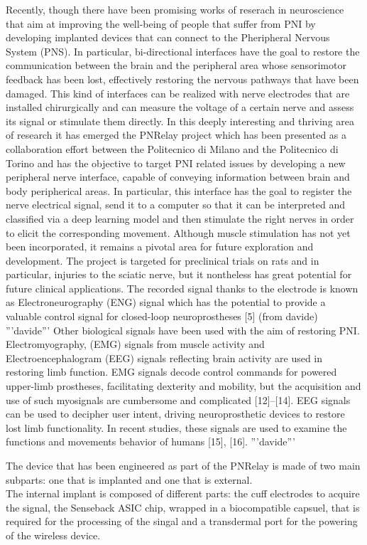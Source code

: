 \documentclass{Configuration_Files/PoliMi3i_thesis}
\begin{document}
Recently, though there have been promising works of reserach in neuroscience that aim at improving the well-being of people that suffer from PNI by developing implanted devices that can connect to the Pheripheral Nervous System (PNS).
In particular, bi-directional interfaces have the goal to restore the communication between the brain and the peripheral area whose sensorimotor feedback has been lost, effectively restoring the nervous pathways that have been damaged.
This kind of interfaces can be realized with nerve electrodes that are installed chirurgically and can measure the voltage of a certain nerve and assess its signal or stimulate them directly.
In this deeply interesting and thriving area of research it has emerged the PNRelay project 
which has been presented as a collaboration effort between the Politecnico di Milano and the Politecnico di Torino and has the objective to target PNI related issues by developing a new peripheral nerve interface, capable of conveying information between brain and body peripherical areas.
In particular, this interface has the goal to register the nerve electrical signal, send it to a computer so that it can be interpreted and classified via a deep learning model and then stimulate the right nerves in order to elicit the corresponding movement.
Although muscle stimulation has not yet been incorporated, it remains a pivotal area for future exploration and development.
The project is targeted for preclinical trials on rats and in particular, injuries to the sciatic nerve, but it nontheless has great potential for future clinical applications.
The recorded signal thanks to the electrode is known as  Electroneurography (ENG) signal
which has the potential to provide a valuable control signal for closed-loop neuroprostheses [5] (from davide)
'''davide'''
Other biological signals have been used with the aim of restoring PNI. Electromyography,
(EMG) signals from muscle activity and Electroencephalogram (EEG) signals reflecting brain activity are used in restoring limb function. EMG signals decode control commands for powered upper-limb prostheses, facilitating dexterity and mobility, but the acquisition and use of such myosignals are cumbersome and complicated [12]–[14]. EEG signals can be used to decipher user intent, driving neuroprosthetic devices to restore lost limb functionality. In recent studies, these signals are used to examine the functions and movements behavior of humans [15], [16].
'''davide'''


The device that has been engineered as part of the PNRelay is made of two main subparts:
one that is implanted and one that is external.
\\
The internal implant is composed of different parts: the cuff electrodes to acquire the signal, the Senseback ASIC chip, wrapped in a biocompatible capsuel, that is required for the processing of the singal and a transdermal port for the powering of the wireless device.
\end{document}
